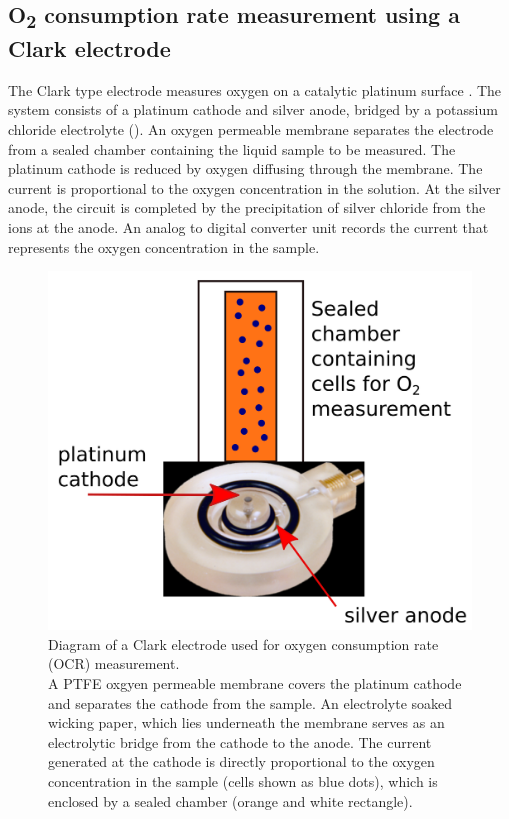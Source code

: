 \subsection{\texorpdfstring{O\textsubscript{2}}{O2} consumption rate measurement using a Clark electrode}
The Clark type electrode measures oxygen on a catalytic platinum surface \cite{li_measurement_2012}. The system consists of a platinum cathode and silver anode, bridged by a potassium chloride electrolyte (). An oxygen permeable membrane separates the electrode from a sealed chamber containing the liquid sample to be measured. The platinum cathode is reduced by oxygen diffusing through the membrane. The current is proportional to the oxygen concentration in the solution. At the silver anode, the circuit is completed by the precipitation of silver chloride from the ions at the anode. An analog to digital converter unit records the current that represents the oxygen concentration in the sample.
%
\begin{figure}[htp]
	\centering
    \includegraphics[width=.7\textwidth]{clark}
    \caption[Diagram of a Clark electrode used for oxygen consumption rate (OCR) measurement]{Diagram of a Clark electrode used for oxygen consumption rate (OCR) measurement.\\
A PTFE oxgyen permeable membrane covers the platinum cathode and separates the cathode from the sample. An electrolyte soaked wicking paper, which lies underneath the membrane serves as an electrolytic bridge from the cathode to the anode. The current generated at the cathode is directly proportional to the oxygen concentration in the sample (cells shown as blue dots), which is enclosed by a sealed chamber (orange and white rectangle).}\label{fig:clark}
\end{figure}
%

